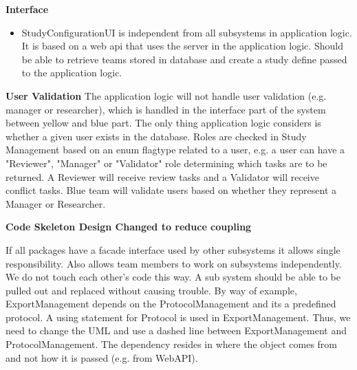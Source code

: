 \textbf{Interface}
\begin{itemize}
	\item StudyConfigurationUI is independent from all subsystems in application logic. It is based on a web api that uses the server in the application logic. Should be able to retrieve teams stored in database and create a study define passed to the application logic. 
	\end{itemize} 
	
\textbf{User Validation}
The application logic will not handle user validation (e.g. manager or researcher), which is handled in the interface part of the system between yellow and blue part. The only thing application logic considers is whether a given user exists in the database. Roles are checked in Study Management based on an enum flagtype related to a user, e.g. a user can have a "Reviewer", "Manager" or "Validator" role determining which tasks are to be returned. A Reviewer will receive review tasks and a Validator will receive conflict tasks. Blue team will validate users based on whether they represent a Manager or Researcher. 

\textbf{Code Skeleton Design Changed to reduce coupling}

If all packages have a facade interface used by other subsystems it allows single responsibility. Also allows team members to work on subsystems independently. We do not touch each other's code this way. A sub system should be able to be pulled out and replaced without causing trouble. By way of example, ExportManagement depends on the ProtocolManagement and its a predefined protocol. A using statement for Protocol is used in ExportManagement. Thus, we need to change the UML and use a dashed line between ExportManagement and ProtocolManagement. The dependency resides in where the object comes from and not how it is passed (e.g. from WebAPI). 
